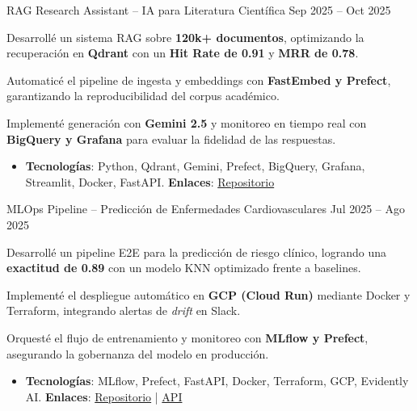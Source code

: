 
\begin{cventries}

  \cventrynew
    {}
    {RAG Research Assistant – IA para Literatura Científica}
    {}
    {Sep 2025 – Oct 2025}
    {
      \begin{cvitems}
        \item Desarrollé un sistema RAG sobre \textbf{120k+ documentos}, optimizando la recuperación en \textbf{Qdrant} con un \textbf{Hit Rate de 0.91} y \textbf{MRR de 0.78}.
        \item Automaticé el pipeline de ingesta y embeddings con \textbf{FastEmbed y Prefect}, garantizando la reproducibilidad del corpus académico.
        \item Implementé generación con \textbf{Gemini 2.5} y monitoreo en tiempo real con \textbf{BigQuery y Grafana} para evaluar la fidelidad de las respuestas.
      \end{cvitems}
      \vspace{14pt}
      \begin{itemize}[leftmargin=*]
        \small
        \item[] \textbf{Tecnologías}: Python, Qdrant, Gemini, Prefect, BigQuery, Grafana, Streamlit, Docker, FastAPI.
        \hspace{1em}
        \textbf{Enlaces}: \href{https://github.com/aletbm/RAG_Research_Assistant}{Repositorio}
      \end{itemize}
    }

  \cventrynew
    {}
    {MLOps Pipeline – Predicción de Enfermedades Cardiovasculares}
    {}
    {Jul 2025 – Ago 2025}
    {
      \begin{cvitems}
        \item Desarrollé un pipeline E2E para la predicción de riesgo clínico, logrando una \textbf{exactitud de 0.89} con un modelo KNN optimizado frente a baselines.
        \item Implementé el despliegue automático en \textbf{GCP (Cloud Run)} mediante Docker y Terraform, integrando alertas de \textit{drift} en Slack.
        \item Orquesté el flujo de entrenamiento y monitoreo con \textbf{MLflow y Prefect}, asegurando la gobernanza del modelo en producción.
      \end{cvitems}
      \vspace{14pt}
      \begin{itemize}[leftmargin=*]
        \small
        \item[] \textbf{Tecnologías}: MLflow, Prefect, FastAPI, Docker, Terraform, GCP, Evidently AI.
        \hspace{1em}
        \textbf{Enlaces}: \href{https://github.com/aletbm/Cardiovascular-Diseases_E2E_MLPipeline}{Repositorio} | \href{https://cardiovascular-diseases-api-761922006747.us-east1.run.app}{API}
      \end{itemize}
    }


\end{cventries}
